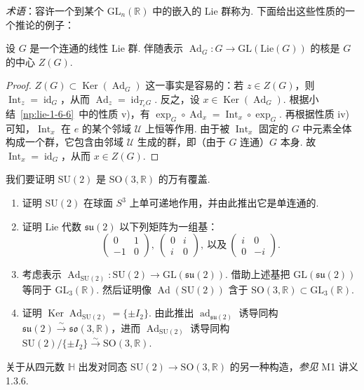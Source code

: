 \emph{术语}：容许一个到某个 $\mathrm{GL}_n(\mathbb R)$ 中的嵌入的 Lie 群称为.
下面给出这些性质的一个推论的例子：
\begin{proposition}\label{prop:lie-1-6-7}
设 $G$ 是一个连通的线性 Lie 群. 伴随表示 $\operatorname{Ad}_G:G\longrightarrow\mathrm{GL}(\mathrm{Lie}(G))$ 的核是 $G$ 的中心 $Z(G)$.
\end{proposition}
\begin{proof}
$Z(G)\subset\operatorname{Ker}(\operatorname{Ad}_G)$ 这一事实是容易的：若 $z\in Z(G)$，则 $\operatorname{Int}_z=\operatorname{id}_G$，从而 $\operatorname{Ad}_z=\operatorname{id}_{T_eG}$. 反之，设 $x\in\operatorname{Ker}(\operatorname{Ad}_G)$. 根据小结~\ref{np:lie-1-6-6}~中的性质 v)，有 $\exp_G\circ\operatorname{Ad}_x=\operatorname{Int}_x\circ\exp_G$. 再根据性质 iv) 可知，$\operatorname{Int}_x$ 在 $e$ 的某个邻域 $\mathcal U$ 上恒等作用. 由于被 $\operatorname{Int}_x$ 固定的 $G$ 中元素全体构成一个群，它包含由邻域 $\mathcal U$ 生成的群，即（由于 $G$ 连通）$G$ 本身. 故 $\operatorname{Int}_x=\operatorname{id}_G$，从而 $x\in Z(G)$.
\end{proof}
\begin{exercise*}
我们要证明 $\mathrm{SU}(2)$ 是 $\mathrm{SO}(3,\mathbb R)$ 的万有覆盖.
\begin{enumerate}[label=\roman*)]
\item 证明 $\mathrm{SU}(2)$ 在球面 $S^3$ 上单可递地作用，并由此推出它是单连通的.
\item 证明 Lie 代数 $\mathfrak{su}(2)$ 以下列矩阵为一组基：
\[
\begin{pmatrix}0&1\\-1&0\end{pmatrix},\
\begin{pmatrix}0&i\\i&0\end{pmatrix},\
\text{以及}\ \begin{pmatrix}i&0\\0&-i\end{pmatrix}.
\]
\item 考虑表示 $\operatorname{Ad}_{\mathrm{SU}(2)}:\mathrm{SU}(2)\longrightarrow\mathrm{GL}(\mathfrak{su}(2))$. 借助上述基把 $\mathrm{GL}(\mathfrak{su}(2))$ 等同于 $\mathrm{GL}_3(\mathbb R)$. 然后证明像 $\operatorname{Ad}(\mathrm{SU}(2))$ 含于 $\mathrm{SO}(3,\mathbb R)\subset\mathrm{GL}_3(\mathbb R)$.
\item 证明 $\operatorname{Ker}\operatorname{Ad}_{\mathrm{SU}(2)}=\{\pm I_2\}$. 由此推出 $\operatorname{ad}_{\mathfrak{su}(2)}$ 诱导同构 $\mathfrak{su}(2)\stackrel{\sim}{\longrightarrow}\mathfrak{so}(3,\mathbb R)$，进而 $\operatorname{Ad}_{\mathrm{SU}(2)}$ 诱导同构 $\mathrm{SU}(2)/\{\pm I_2\}\stackrel{\sim}{\longrightarrow}\mathrm{SO}(3,\mathbb R)$.
\end{enumerate}
\end{exercise*}
关于从四元数 $\mathbb H$ 出发对同态 $\mathrm{SU}(2)\longrightarrow\mathrm{SO}(3,\mathbb R)$ 的另一种构造，\emph{参见} M1 讲义 1.3.6.
